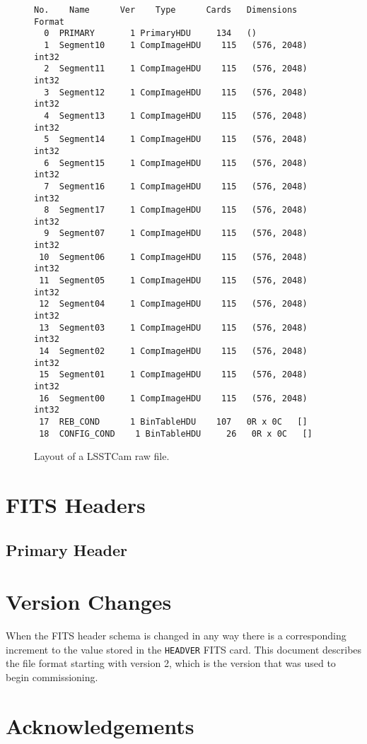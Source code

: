 \documentclass[OPS,lsstdraft,authoryear,toc]{lsstdoc}
\begin{document}
\begin{figure}
\begin{verbatim}
No.    Name      Ver    Type      Cards   Dimensions   Format
  0  PRIMARY       1 PrimaryHDU     134   ()
  1  Segment10     1 CompImageHDU    115   (576, 2048)   int32
  2  Segment11     1 CompImageHDU    115   (576, 2048)   int32
  3  Segment12     1 CompImageHDU    115   (576, 2048)   int32
  4  Segment13     1 CompImageHDU    115   (576, 2048)   int32
  5  Segment14     1 CompImageHDU    115   (576, 2048)   int32
  6  Segment15     1 CompImageHDU    115   (576, 2048)   int32
  7  Segment16     1 CompImageHDU    115   (576, 2048)   int32
  8  Segment17     1 CompImageHDU    115   (576, 2048)   int32
  9  Segment07     1 CompImageHDU    115   (576, 2048)   int32
 10  Segment06     1 CompImageHDU    115   (576, 2048)   int32
 11  Segment05     1 CompImageHDU    115   (576, 2048)   int32
 12  Segment04     1 CompImageHDU    115   (576, 2048)   int32
 13  Segment03     1 CompImageHDU    115   (576, 2048)   int32
 14  Segment02     1 CompImageHDU    115   (576, 2048)   int32
 15  Segment01     1 CompImageHDU    115   (576, 2048)   int32
 16  Segment00     1 CompImageHDU    115   (576, 2048)   int32
 17  REB_COND      1 BinTableHDU    107   0R x 0C   []
 18  CONFIG_COND    1 BinTableHDU     26   0R x 0C   []
\end{verbatim}
\caption{Layout of a LSSTCam raw file.}
\label{fig:layout}
\end{figure}

\section{FITS Headers}

\subsection{Primary Header}

\appendix

\section{Version Changes}

When the FITS header schema is changed in any way there is a corresponding increment to the value stored in the \texttt{HEADVER} FITS card.
This document describes the file format starting with version 2, which is the version that was used to begin commissioning.

\section{Acknowledgements}
\end{document}
